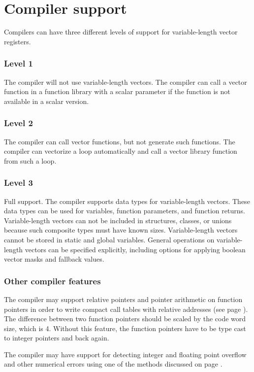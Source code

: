 \documentclass[forwardcom.tex]{subfiles}
\begin{document}
\section{Compiler support} \label{compilerSupport}
Compilers can have three different levels of support for variable-length vector registers. 

\subsubsection{Level 1}
The compiler will not use variable-length vectors. The compiler can call a vector function in a function library with a scalar parameter if the function is not available in a scalar version. 

\subsubsection{Level 2}
The compiler can call vector functions, but not generate such functions. The compiler can vectorize a loop automatically and call a vector library function from such a loop. 

\subsubsection{Level 3}
Full support. The compiler supports data types for variable-length vectors. These data types can be used for variables, function parameters, and function returns. Variable-length vectors can not be included in structures, classes, or unions because such composite types must have known sizes. 
Variable-length vectors cannot be stored in static and global variables.
General operations on variable-length vectors can be specified explicitly, including options for applying boolean vector masks and fallback values.

\subsubsection{Other compiler features}
The compiler may support relative pointers and pointer arithmetic on function pointers in order to write compact call tables with relative addresses (see page \pageref{AbsoluteAndRelativePointers}). The difference between two function pointers should be scaled by the code word size, which is 4. Without this feature, the function pointers have to be type cast to integer pointers and back again. 

\vv
The compiler may have support for detecting integer and floating point overflow and other numerical errors using one of the methods discussed on page \pageref{integerOverflowDetection}.
\end{document}

